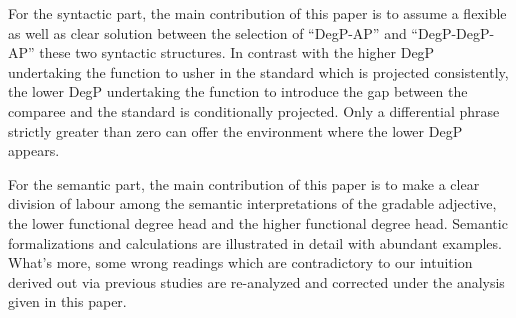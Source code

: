 \documentclass{ctexart}
\begin{document}
For the syntactic part, the main contribution of this paper is to assume a flexible as well as clear solution between the selection of ``DegP-AP'' and ``DegP-DegP-AP'' these two syntactic structures. In contrast with the higher DegP undertaking the function to usher in the standard which is projected consistently, the lower DegP undertaking the function to introduce the gap between the comparee and the standard is conditionally projected. Only a differential phrase strictly greater than zero can offer the environment where the lower DegP appears.

For the semantic part, the main contribution of this paper is to make a clear division of labour among the semantic interpretations of the gradable adjective, the lower functional degree head and the higher functional degree head. Semantic formalizations and calculations are illustrated in detail with abundant examples. What's more, some wrong readings which are contradictory to our intuition derived out via previous studies are re-analyzed and corrected under the analysis given in this paper.

\newpage

\printbibliography
\end{document}
